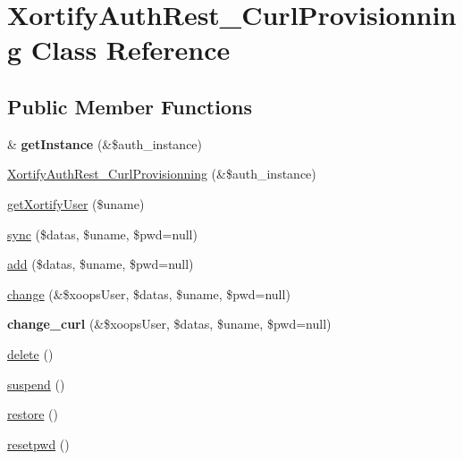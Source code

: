 \hypertarget{class_xortify_auth_rest___curl_provisionning}{\section{Xortify\-Auth\-Rest\-\_\-\-Curl\-Provisionning Class Reference}
\label{class_xortify_auth_rest___curl_provisionning}
}
\subsection*{Public Member Functions}
\begin{DoxyCompactItemize}
\item 
\hypertarget{class_xortify_auth_rest___curl_provisionning_a2c8eaa915c70d75289ac8a03686194f9}{\& {\bfseries get\-Instance} (\&\$auth\-\_\-instance)}\label{class_xortify_auth_rest___curl_provisionning_a2c8eaa915c70d75289ac8a03686194f9}

\item 
\hyperlink{class_xortify_auth_rest___curl_provisionning_a68de3f383b2ad5d695215059fdeed7fa}{Xortify\-Auth\-Rest\-\_\-\-Curl\-Provisionning} (\&\$auth\-\_\-instance)
\item 
\hyperlink{class_xortify_auth_rest___curl_provisionning_a041d726ac26672547ed1504e8e0117aa}{get\-Xortify\-User} (\$uname)
\item 
\hyperlink{class_xortify_auth_rest___curl_provisionning_a35dc08b0f2138eb818ff95345b73bcff}{sync} (\$datas, \$uname, \$pwd=null)
\item 
\hyperlink{class_xortify_auth_rest___curl_provisionning_adfc9fcef01e7bd7b2f47e8e79d51fc63}{add} (\$datas, \$uname, \$pwd=null)
\item 
\hyperlink{class_xortify_auth_rest___curl_provisionning_ae1f0971b9712c794620cf309164e43af}{change} (\&\$xoops\-User, \$datas, \$uname, \$pwd=null)
\item 
\hypertarget{class_xortify_auth_rest___curl_provisionning_aba6f598c234d191a3b3934f90b35fd9f}{{\bfseries change\-\_\-curl} (\&\$xoops\-User, \$datas, \$uname, \$pwd=null)}\label{class_xortify_auth_rest___curl_provisionning_aba6f598c234d191a3b3934f90b35fd9f}

\item 
\hyperlink{class_xortify_auth_rest___curl_provisionning_a13bdffdd926f26b825ea57066334ff01}{delete} ()
\item 
\hyperlink{class_xortify_auth_rest___curl_provisionning_ad73006a505121228f3b075c2409787d2}{suspend} ()
\item 
\hyperlink{class_xortify_auth_rest___curl_provisionning_aa1371f22826cf8cde4454c9b467203d0}{restore} ()
\item 
\hyperlink{class_xortify_auth_rest___curl_provisionning_a06d70fbd3a2db390b6f2530c0076628e}{resetpwd} ()
\end{DoxyCompactItemize}
